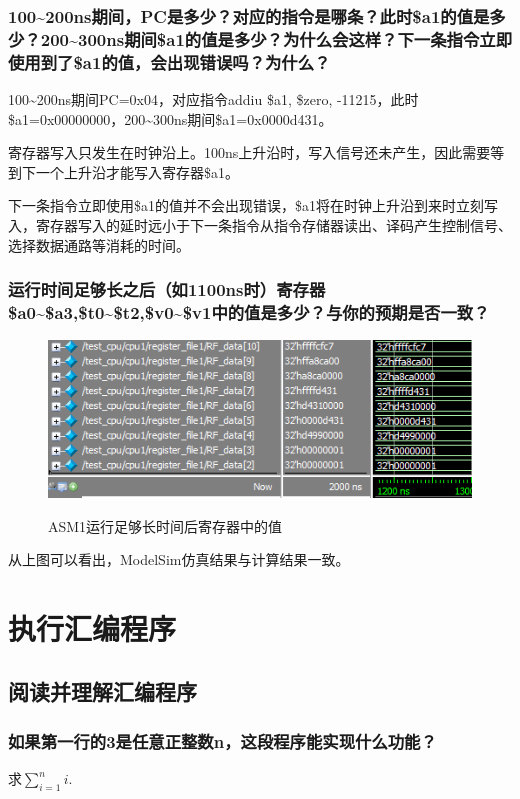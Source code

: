 \documentclass{article}
\begin{document}
            \subsubsection*{100\~{}200ns期间，PC是多少？对应的指令是哪条？此时\$a1的值是多少？200\~{}300ns期间\$a1的值是多少？为什么会这样？下一条指令立即使用到了\$a1的值，会出现错误吗？为什么？}
            100\~{}200ns期间PC=0x04，对应指令addiu \$a1, \$zero, -11215，此时\$a1=0x00000000，200\~{}300ns期间\$a1=0x0000d431。

            寄存器写入只发生在时钟沿上。100ns上升沿时，写入信号还未产生，因此需要等到下一个上升沿才能写入寄存器\$a1。

            下一条指令立即使用\$a1的值并不会出现错误，\$a1将在时钟上升沿到来时立刻写入，寄存器写入的延时远小于下一条指令从指令存储器读出、译码产生控制信号、选择数据通路等消耗的时间。
            \subsubsection*{运行时间足够长之后（如1100ns时）寄存器\$a0\~{}\$a3,\$t0\~{}\$t2,\$v0\~{}\$v1中的值是多少？与你的预期是否一致？}
            \begin{figure}[htb]
                \centering
                \includegraphics{fig1.png} \\
                \caption{\label{fig:reg-value-1}ASM1运行足够长时间后寄存器中的值}
            \end{figure}
            从上图可以看出，ModelSim仿真结果与计算结果一致。
    \section{执行汇编程序}
        \subsection{阅读并理解汇编程序}
            \subsubsection*{如果第一行的3是任意正整数n，这段程序能实现什么功能？}
            求$\sum_{i=1}^{n}{i}$.
\end{document}
